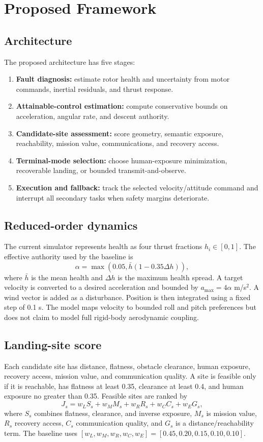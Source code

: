 \documentclass[conference]{IEEEtran}
\begin{document}
\section{Proposed Framework}
\subsection{Architecture}
The proposed architecture has five stages:
\begin{enumerate}
\item \textbf{Fault diagnosis:} estimate rotor health and uncertainty from
motor commands, inertial residuals, and thrust response.
\item \textbf{Attainable-control estimation:} compute conservative bounds on
acceleration, angular rate, and descent authority.
\item \textbf{Candidate-site assessment:} score geometry, semantic exposure,
reachability, mission value, communications, and recovery access.
\item \textbf{Terminal-mode selection:} choose human-exposure minimization,
recoverable landing, or bounded transmit-and-observe.
\item \textbf{Execution and fallback:} track the selected velocity/attitude
command and interrupt all secondary tasks when safety margins deteriorate.
\end{enumerate}

\subsection{Reduced-order dynamics}
The current simulator represents health as four thrust fractions
$h_i\in[0,1]$. The effective authority used by the baseline is
\begin{equation}
\alpha=\max\left(0.05,\bar{h}(1-0.35\Delta h)\right),
\end{equation}
where $\bar{h}$ is the mean health and $\Delta h$ is the maximum health
spread. A target velocity is converted to a desired acceleration and bounded
by $a_{\max}=4\alpha$ m/s$^2$. A wind vector is added as a disturbance.
Position is then integrated using a fixed step of 0.1 s. The model maps
velocity to bounded roll and pitch preferences but does not claim to model
full rigid-body aerodynamic coupling.

\subsection{Landing-site score}
Each candidate site has distance, flatness, obstacle clearance, human
exposure, recovery access, mission value, and communication quality. A site is
feasible only if it is reachable, has flatness at least 0.35, clearance at
least 0.4, and human exposure no greater than 0.35. Feasible sites are ranked
by
\begin{equation}
J_s=w_L S_s+w_M M_s+w_R R_s+w_C C_s+w_E G_s,
\end{equation}
where $S_s$ combines flatness, clearance, and inverse exposure, $M_s$ is
mission value, $R_s$ recovery access, $C_s$ communication quality, and $G_s$
is a distance/reachability term. The baseline uses
$[w_L,w_M,w_R,w_C,w_E]=[0.45,0.20,0.15,0.10,0.10]$.
\end{document}
